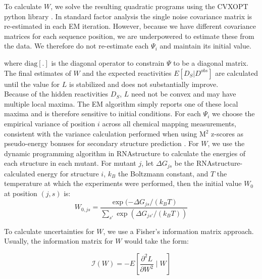 \documentclass[12pt]{article}
\begin{document}
To calculate $W$, we solve the resulting quadratic programs using the CVXOPT python library \cite{Dahl2006}. 
In standard factor analysis the single noise covariance matrix is re-estimated in each EM iteration. 
However, because we have different covariance matrices for each sequence position, we are underpowered to estimate these from the data. 
We therefore do not re-estimate each $\Psi_{i}$ and maintain its initial value.


where $\mbox{diag}[.]$ is the diagonal operator to constrain $\Psi$ to be a diagonal matrix. 
The final estimates of $W$ and the expected reactivities $E[D_S|D^{obs}]$ are calculated until the value for $L$ is stabilized and does not substantially improve.\\

Because of the hidden reactivities $D_S$, $L$ need not be convex and may have multiple local maxima. 
The EM algorithm simply reports one of these local maxima and is therefore sensitive to initial conditions. 
For each $\Psi_{i}$ we choose the empirical variance of position $i$ across all chemical mapping measurements, consistent with the variance calculation performed when using M$^2$ z-scores as pseudo-energy bonuses for secondary structure prediction \cite{Kladwang2011f}. 
For $W$, we use the dynamic programming algorithm in RNAstructure to calculate the energies of each structure in each mutant. 
For mutant $j$, let $\Delta G_{js}$ be the RNAstructure-calculated energy for structure $i$, $k_B$ the Boltzmann constant, and $T$ the temperature at which the experiments were performed, then the initial value $W_0$ at position $(j,s)$ is:
\[W_{0,js} = \frac{\exp(-\Delta G_{js}/(k_BT)}{\sum_{s'} \exp(\Delta G_{js'}/(k_BT))}\]

To calculate uncertainties for $W$, we use a Fisher's information matrix approach. 
Usually, the information matrix for $W$ would take the form:

\[\mathcal{I}(W) = -E\left[\frac{\partial^2 L}{\partial W^2} \mid W\right]\]
\end{document}
